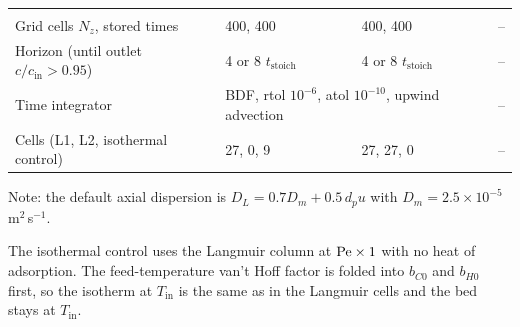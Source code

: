 \begin{table}[htbp]
\begin{tabularx}{\textwidth}{@{}>{\raggedright\arraybackslash}Xlll@{}}
\midrule
\multicolumn{4}{@{}l}{\textit{Solves}}\\
Grid cells $N_z$, stored times & 400, 400 & 400, 400 & -- \\
Horizon (until outlet $c/c_{\mathrm{in}} > 0.95$) & 4 or 8 $t_{\mathrm{stoich}}$ & 4 or 8 $t_{\mathrm{stoich}}$ & -- \\
Time integrator & \multicolumn{2}{l}{BDF, rtol $10^{-6}$, atol $10^{-10}$, upwind advection} & -- \\
Cells (L1, L2, isothermal control) & 27, 0, 9 & 27, 27, 0 & -- \\
\bottomrule
\end{tabularx}
\par\smallskip
\raggedright Note: the default axial dispersion is $D_L = 0.7 D_m + 0.5\,d_p u$ with
$D_m = 2.5\times10^{-5}$\,m$^2$\,s$^{-1}$.
\end{table}

The isothermal control uses the Langmuir column at $\mathrm{Pe} \times 1$ with no heat of adsorption.
The feed-temperature van't Hoff factor is folded into $b_{C0}$ and $b_{H0}$ first, so the
isotherm at $T_{\mathrm{in}}$ is the same as in the Langmuir cells and the bed stays at
$T_{\mathrm{in}}$.

\clearpage
